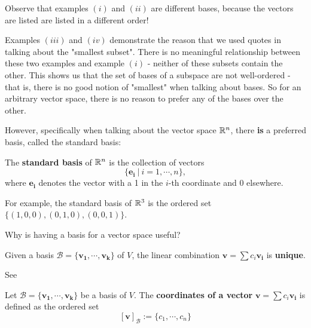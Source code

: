     Observe that examples $(i)$ and $(ii)$ are different bases, because the vectors are listed are listed in a different order!
    
    Examples $(iii)$ and $(iv)$ demonstrate the reason that we used quotes in talking about the "smallest subset".  There is no meaningful relationship between these two examples and example $(i)$ - neither of these subsets contain the other.  This shows us that the set of bases of a subspace are not well-ordered - that is, there is no good notion of "smallest" when talking about bases.  So for an arbitrary vector space, there is no reason to prefer any of the bases over the other.
    
    However, specifically when talking about the vector space $\mathbb{R}^n$, there \textbf{is} a preferred basis, called the standard basis:
    
    \begin{definition}
    The \textbf{standard basis} of $\mathbb{R}^n$ is the collection of vectors $$\{\bm{e_i} \ | \ i = 1, \cdots, n\},$$ where $\bm{e_i}$ denotes the vector with a 1 in the $i$-th coordinate and 0 elsewhere.
    \end{definition}
    
    \begin{example}
    For example, the standard basis of $\mathbb{R}^3$ is the ordered set $\{(1,0,0), (0,1,0), (0,0,1)\}$.
    \end{example}
    
    \begin{motivating}
    Why is having a basis for a vector space useful?
    \end{motivating}
    
    
    
    \begin{theorem}\label{thm:basisunique}
    Given a basis $\mathscr{B} = \{\bm{v_1}, \cdots, \bm{v_k}\}$ of $V$, the linear combination $\bm{v} = \sum c_i \bm{v_i}$ is \textbf{unique}.
    \end{theorem}
    
    See
    
    \begin{definition}
    Let $\mathscr{B} = \{\bm{v_1}, \cdots, \bm{v_k}\}$ be a basis of $V$.  The \textbf{coordinates of a vector} $\bm{v} = \sum c_i \bm{v_i}$ is defined as the ordered set
    $$[\bm{v}]_\mathscr{B} := \{c_1, \cdots, c_n\}$$
    \end{definition}

